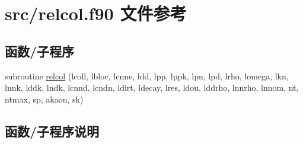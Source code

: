 \hypertarget{relcol_8f90}{}\section{src/relcol.f90 文件参考}
\label{relcol_8f90}
\subsection*{函数/子程序}
\begin{DoxyCompactItemize}
\item 
subroutine \mbox{\hyperlink{relcol_8f90_acbace5cff9ef2f3a8fd2d831dc30c3ff}{relcol}} (lcoll, lbloc, lcnne, ldd, lpp, lppk, lpn, lpd, lrho, lomega, lkn, lnnk, lddk, lndk, lcnnd, lcndn, ldirt, ldecay, lres, ldou, lddrho, lnnrho, lnnom, nt, ntmax, sp, akaon, sk)
\end{DoxyCompactItemize}


\subsection{函数/子程序说明}
\mbox{\label{relcol_8f90_acbace5cff9ef2f3a8fd2d831dc30c3ff}} 
